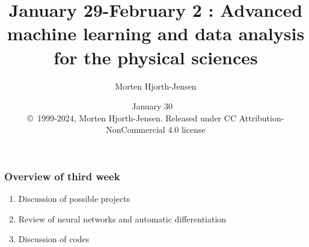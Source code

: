 \documentclass{beamer}
\begin{document}

\newcommand{\exercisesection}[1]{\subsection*{#1}}







\title{January 29-February 2 : Advanced machine learning and data analysis for the physical sciences}


\author{Morten Hjorth-Jensen}

\date{January 30
\ \\ 
{\tiny \copyright\ 1999-2024, Morten Hjorth-Jensen. Released under CC Attribution-NonCommercial 4.0 license}
}

\begin{frame}
\titlepage
\end{frame}

\begin{frame}
\frametitle{Overview of third  week}

\begin{block}{}
\begin{enumerate}
 \item Discussion of possible projects

 \item Review of neural networks and automatic differentiation

 \item Discussion of codes
\end{enumerate}

\noindent
\end{block}
\end{frame}
\end{document}
